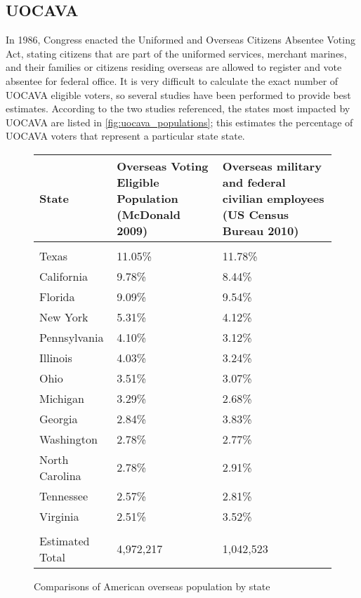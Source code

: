 \subsection{UOCAVA}
In 1986, Congress enacted the Uniformed and Overseas Citizens Absentee Voting Act, stating citizens that are part of the uniformed services, merchant marines, and their families or citizens residing overseas are allowed to register and vote absentee for federal office. It is very difficult to calculate the exact number of UOCAVA eligible voters, so several studies have been performed to provide best estimates. According to the two studies referenced, the states most impacted by UOCAVA are listed in 
\autoref{fig:uocava_populations}; this estimates the percentage of UOCAVA voters that represent a particular state state.

\begin{figure}
\begin{center}
\begin{tabular}{l p{} p{}} %
{\bf State} & {\bf Overseas Voting Eligible \newline Population} \newline(McDonald 2009) & {\bf Overseas military and federal \newline civilian employees} \newline(US Census Bureau 2010)\\\hline\\
Texas & 11.05\% & 11.78\%\\
California & 9.78\% & 8.44\% \\
Florida & 9.09\% & 9.54\% \\
New York & 5.31\% & 4.12\% \\
Pennsylvania & 4.10\% & 3.12\% \\
Illinois & 4.03\% & 3.24\% \\
Ohio & 3.51\% & 3.07\% \\
Michigan & 3.29\% & 2.68\% \\
Georgia & 2.84\% & 3.83\% \\
Washington & 2.78\% & 2.77\% \\
North Carolina & 2.78\% & 2.91\% \\
Tennessee & 2.57\% & 2.81\% \\
Virginia & 2.51\% & 3.52\% \\\hline\\
Estimated Total & 4,972,217 & 1,042,523
\end{tabular}
\end{center}
\caption{Comparisons of American overseas population by state}
\label{fig:uocava_populations}
\end{figure}


